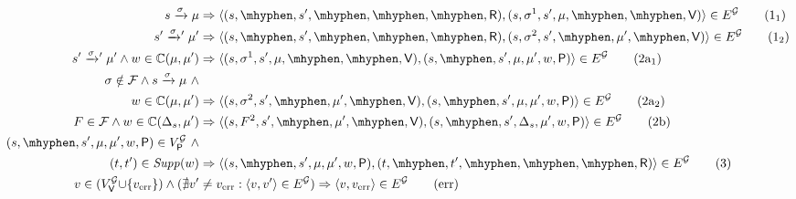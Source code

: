 \begin{definition}
{  \begin{align*}
    s \xrightarrow{\sigma} \mu
    & \Rightarrow \tuple{(s, \mhyphen, s', \mhyphen, \mhyphen, \mhyphen, \Refuter), (s, \sigma^{1}, s', \mu, \mhyphen, \mhyphen, \Verifier)}\in E^\StochG
    \tag{1$_1$}\label{play:r:1}\\
    s' \xrightarrowprime{\sigma} \mu'
    & \Rightarrow \tuple{(s, \mhyphen, s', \mhyphen, \mhyphen, \mhyphen, \Refuter),(s, \sigma^{2}, s', \mhyphen, \mu', \mhyphen, \Verifier)}\in E^\StochG
    \tag{1$_2$}\label{play:r:2}\\
    {s' \xrightarrowprime{\sigma} \mu'} \wedge {w \in \couplings{\mu}{\mu'}}
    & \Rightarrow \tuple{(s, \sigma^1, s', \mu, \mhyphen, \mhyphen, \Verifier),(s, \mhyphen, s', \mu, \mu', w, \Probabilistic)}\in E^\StochG
    \tag{2a$_1$}\label{play:v:1}\\
    \!\!\!{\sigma \notin \faults} \wedge {s \xrightarrow{\sigma} \mu}\ \wedge & \\
    {w \in \couplings{\mu}{\mu'}}
    & \Rightarrow \tuple{(s, \sigma^2, s', \mhyphen, \mu', \mhyphen, \Verifier), (s, \mhyphen, s', \mu, \mu', w, \Probabilistic)}\in E^\StochG
    \tag{2a$_2$}\label{play:v:2a}\\
    {F \in \faults} \wedge {w \in \couplings{\Dirac_s}{\mu'}}
    & \Rightarrow \tuple{(s, F^2, s', \mhyphen, \mu', \mhyphen, \Verifier), (s, \mhyphen, s', \Dirac_s, \mu', w, \Probabilistic)}\in E^\StochG
    \tag{2b}\label{play:v:2b}\\
    (s, \mhyphen, s', \mu, \mu', w, \Probabilistic) \in V^\StochG_\Probabilistic\ \wedge & \\ 
    (t,t') \in \support{w} 
    & \Rightarrow \tuple{(s, \mhyphen, s', \mu, \mu', w, \Probabilistic), (t, \mhyphen, t', \mhyphen, \mhyphen, \mhyphen, \Refuter)}\in E^\StochG
    \tag{3}\label{play:p}\\
    {v\in (V^\StochG_\Verifier{\cup}\{\ErrorSt\})} \wedge ({\nexists v'} & {}\neq\ErrorSt : {\tuple{v,v'}\in E^\StochG})
    \Rightarrow  \tuple{v,\ErrorSt}\in E^\StochG
    \tag{err}\label{play:err}
  \end{align*}
  }%
\end{definition}

